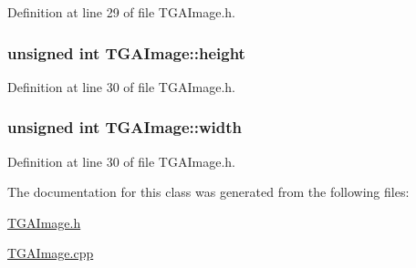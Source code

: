 Definition at line 29 of file T\-G\-A\-Image.\-h.

\hypertarget{class_t_g_a_image_a1c4a71ac195496eeaf7ed6d3e9dfe0ac}{
\subsubsection[{height}]{\setlength{\rightskip}{0pt plus 5cm}unsigned int T\-G\-A\-Image\-::height}}\label{class_t_g_a_image_a1c4a71ac195496eeaf7ed6d3e9dfe0ac}


Definition at line 30 of file T\-G\-A\-Image.\-h.

\hypertarget{class_t_g_a_image_a8a7bef4441a3cd17e237bee43e654b5a}{
\subsubsection[{width}]{\setlength{\rightskip}{0pt plus 5cm}unsigned int T\-G\-A\-Image\-::width}}\label{class_t_g_a_image_a8a7bef4441a3cd17e237bee43e654b5a}


Definition at line 30 of file T\-G\-A\-Image.\-h.



The documentation for this class was generated from the following files\-:\begin{DoxyCompactItemize}
\item 
\hyperlink{_t_g_a_image_8h}{T\-G\-A\-Image.\-h}\item 
\hyperlink{_t_g_a_image_8cpp}{T\-G\-A\-Image.\-cpp}\end{DoxyCompactItemize}
